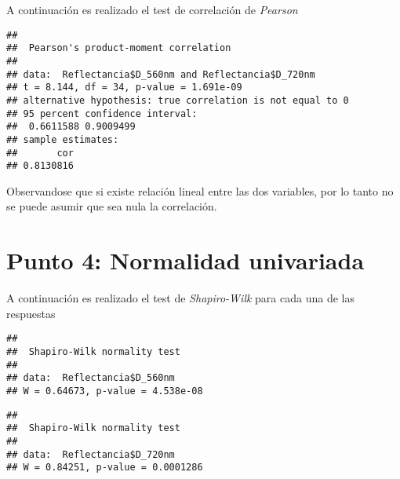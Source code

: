 \documentclass[
]{article}
\newenvironment{Shaded}{\begin{snugshade}}{\end{snugshade}}
\newcommand{\KeywordTok}[1]{\textcolor[rgb]{0.13,0.29,0.53}{\textbf{#1}}}
\newcommand{\NormalTok}[1]{#1}
\newcommand{\OperatorTok}[1]{\textcolor[rgb]{0.81,0.36,0.00}{\textbf{#1}}}
\begin{document}
A continuación es realizado el test de correlación de \emph{Pearson}

\begin{Shaded}
\end{Shaded}

\begin{verbatim}
## 
##  Pearson's product-moment correlation
## 
## data:  Reflectancia$D_560nm and Reflectancia$D_720nm
## t = 8.144, df = 34, p-value = 1.691e-09
## alternative hypothesis: true correlation is not equal to 0
## 95 percent confidence interval:
##  0.6611588 0.9009499
## sample estimates:
##       cor 
## 0.8130816
\end{verbatim}

Observandose que si existe relación lineal entre las dos variables, por
lo tanto no se puede asumir que sea nula la correlación.

\hypertarget{punto-4-normalidad-univariada}{%
\section{Punto 4: Normalidad
univariada}\label{punto-4-normalidad-univariada}}

A continuación es realizado el test de \emph{Shapiro-Wilk} para cada una
de las respuestas

\begin{Shaded}
\end{Shaded}

\begin{verbatim}
## 
##  Shapiro-Wilk normality test
## 
## data:  Reflectancia$D_560nm
## W = 0.64673, p-value = 4.538e-08
\end{verbatim}

\begin{Shaded}
\end{Shaded}

\begin{verbatim}
## 
##  Shapiro-Wilk normality test
## 
## data:  Reflectancia$D_720nm
## W = 0.84251, p-value = 0.0001286
\end{verbatim}
\end{document}
